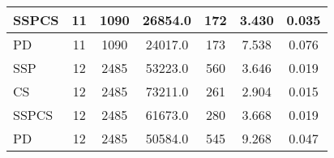 \documentclass{article}
\begin{document}
\begin{table}[H]
{\begin{tabular}{|l|c|c|c|c|c|c|}
SSPCS              & 11             & 1090              & 26854.0                & 172            & 3.430                     & 0.035                                   \\ \hline
PD                 & 11             & 1090              & 24017.0                & 173            & 7.538                     & 0.076                                   \\ \hline
SSP                & 12             & 2485              & 53223.0                & 560            & 3.646                     & 0.019                                   \\ \hline
CS                 & 12             & 2485              & 73211.0                & 261            & 2.904                     & 0.015                                   \\ \hline
SSPCS              & 12             & 2485              & 61673.0                & 280            & 3.668                     & 0.019                                   \\ \hline
PD                 & 12             & 2485              & 50584.0                & 545            & 9.268                     & 0.047                                   \\ \hline
\end{tabular}%
}
\label{tab:simulation2_set1_algorithm_metrics}
\end{table}

\begin{table}[H]
\centering
\caption{Simulation 2, Set 2: Graph Characteristics}
\label{tab:simulation2_set2_graph_characteristics}
\end{table}
\end{document}
